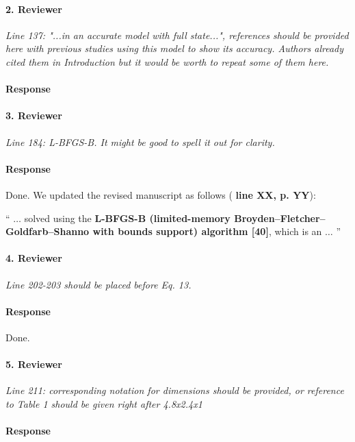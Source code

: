 \documentclass[]{article}
\newcommand{\red}[1]{\textbf{\color{red} #1}}
\newcommand{\revision}[1]{\textbf{#1}}
\begin{document}
\hrulefill

\paragraph{2. Reviewer} \textit{Line 137: "...in an accurate model with full state...", references should be provided here with previous studies using this model to show its accuracy. Authors already cited them in Introduction but it would be worth to repeat some of them here.}

\paragraph{Response} 

\hrulefill

\paragraph{3. Reviewer} \textit{Line 184: L-BFGS-B. It might be good to spell it out for clarity.}

\paragraph{Response} Done. We updated the revised manuscript as follows (\red{line XX, p. YY}):

`` 
$\dots$ solved using the \revision{L-BFGS-B (limited-memory Broyden--Fletcher--Goldfarb--Shanno with bounds support) algorithm [40]}, which is an $\dots$
''

\hrulefill

\paragraph{4. Reviewer} \textit{Line 202-203 should be placed before Eq. 13.}

\paragraph{Response} Done.

\hrulefill

\paragraph{5. Reviewer} \textit{Line 211: corresponding notation for dimensions should be provided, or reference to Table 1 should be given right after 4.8x2.4x1}

\paragraph{Response} 
\end{document}
